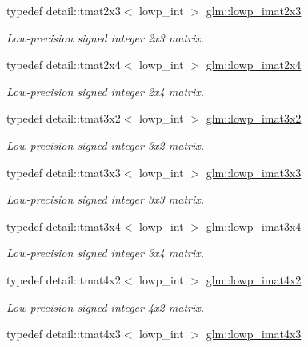 \begin{DoxyCompactItemize}
typedef detail\-::tmat2x3$<$ lowp\-\_\-int $>$ \hyperlink{group__gtc__matrix__integer_ga09e5448647001fa527ea02951cbca6ec}{glm\-::lowp\-\_\-imat2x3}
\begin{DoxyCompactList}\small\item\em Low-\/precision signed integer 2x3 matrix. \end{DoxyCompactList}\item 
typedef detail\-::tmat2x4$<$ lowp\-\_\-int $>$ \hyperlink{group__gtc__matrix__integer_ga413aeb4042293dc84969db1e8f3d0619}{glm\-::lowp\-\_\-imat2x4}
\begin{DoxyCompactList}\small\item\em Low-\/precision signed integer 2x4 matrix. \end{DoxyCompactList}\item 
typedef detail\-::tmat3x2$<$ lowp\-\_\-int $>$ \hyperlink{group__gtc__matrix__integer_gac67f73a4e34205b8d96af7e85cc7a194}{glm\-::lowp\-\_\-imat3x2}
\begin{DoxyCompactList}\small\item\em Low-\/precision signed integer 3x2 matrix. \end{DoxyCompactList}\item 
typedef detail\-::tmat3x3$<$ lowp\-\_\-int $>$ \hyperlink{group__gtc__matrix__integer_ga3e100ab14fdaeae0d30d66d93c6904a7}{glm\-::lowp\-\_\-imat3x3}
\begin{DoxyCompactList}\small\item\em Low-\/precision signed integer 3x3 matrix. \end{DoxyCompactList}\item 
typedef detail\-::tmat3x4$<$ lowp\-\_\-int $>$ \hyperlink{group__gtc__matrix__integer_gaefcf7682fee103d6f8c9315420a6bcd5}{glm\-::lowp\-\_\-imat3x4}
\begin{DoxyCompactList}\small\item\em Low-\/precision signed integer 3x4 matrix. \end{DoxyCompactList}\item 
typedef detail\-::tmat4x2$<$ lowp\-\_\-int $>$ \hyperlink{group__gtc__matrix__integer_ga6b4261f0c13ebc56e2bc76bf7170830c}{glm\-::lowp\-\_\-imat4x2}
\begin{DoxyCompactList}\small\item\em Low-\/precision signed integer 4x2 matrix. \end{DoxyCompactList}\item 
typedef detail\-::tmat4x3$<$ lowp\-\_\-int $>$ \hyperlink{group__gtc__matrix__integer_gaae7774306f7549793307afb385738163}{glm\-::lowp\-\_\-imat4x3}

\end{DoxyCompactItemize}
